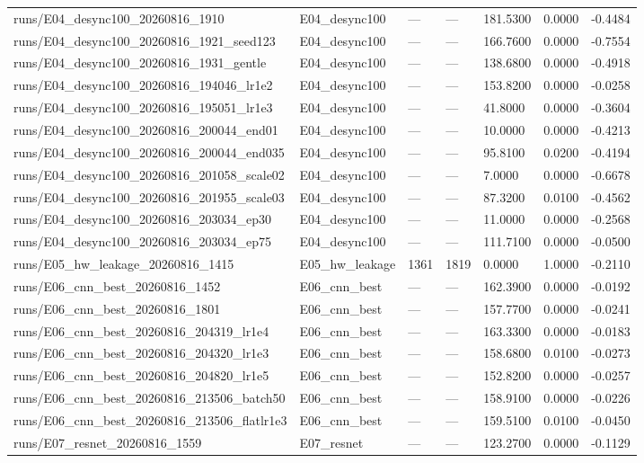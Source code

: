 \begin{tabular}{lllllll}
runs/E04_desync100_20260816_1910 & E04_desync100 & — & — & 181.5300 & 0.0000 & -0.4484 \\
runs/E04_desync100_20260816_1921_seed123 & E04_desync100 & — & — & 166.7600 & 0.0000 & -0.7554 \\
runs/E04_desync100_20260816_1931_gentle & E04_desync100 & — & — & 138.6800 & 0.0000 & -0.4918 \\
runs/E04_desync100_20260816_194046_lr1e2 & E04_desync100 & — & — & 153.8200 & 0.0000 & -0.0258 \\
runs/E04_desync100_20260816_195051_lr1e3 & E04_desync100 & — & — & 41.8000 & 0.0000 & -0.3604 \\
runs/E04_desync100_20260816_200044_end01 & E04_desync100 & — & — & 10.0000 & 0.0000 & -0.4213 \\
runs/E04_desync100_20260816_200044_end035 & E04_desync100 & — & — & 95.8100 & 0.0200 & -0.4194 \\
runs/E04_desync100_20260816_201058_scale02 & E04_desync100 & — & — & 7.0000 & 0.0000 & -0.6678 \\
runs/E04_desync100_20260816_201955_scale03 & E04_desync100 & — & — & 87.3200 & 0.0100 & -0.4562 \\
runs/E04_desync100_20260816_203034_ep30 & E04_desync100 & — & — & 11.0000 & 0.0000 & -0.2568 \\
runs/E04_desync100_20260816_203034_ep75 & E04_desync100 & — & — & 111.7100 & 0.0000 & -0.0500 \\
runs/E05_hw_leakage_20260816_1415 & E05_hw_leakage & 1361 & 1819 & 0.0000 & 1.0000 & -0.2110 \\
runs/E06_cnn_best_20260816_1452 & E06_cnn_best & — & — & 162.3900 & 0.0000 & -0.0192 \\
runs/E06_cnn_best_20260816_1801 & E06_cnn_best & — & — & 157.7700 & 0.0000 & -0.0241 \\
runs/E06_cnn_best_20260816_204319_lr1e4 & E06_cnn_best & — & — & 163.3300 & 0.0000 & -0.0183 \\
runs/E06_cnn_best_20260816_204320_lr1e3 & E06_cnn_best & — & — & 158.6800 & 0.0100 & -0.0273 \\
runs/E06_cnn_best_20260816_204820_lr1e5 & E06_cnn_best & — & — & 152.8200 & 0.0000 & -0.0257 \\
runs/E06_cnn_best_20260816_213506_batch50 & E06_cnn_best & — & — & 158.9100 & 0.0000 & -0.0226 \\
runs/E06_cnn_best_20260816_213506_flatlr1e3 & E06_cnn_best & — & — & 159.5100 & 0.0100 & -0.0450 \\
runs/E07_resnet_20260816_1559 & E07_resnet & — & — & 123.2700 & 0.0000 & -0.1129 \\

\end{tabular}
